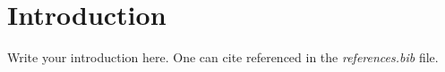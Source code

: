 \section{Introduction}

Write your introduction here. One can cite\cite{ARXIVEXAMPLE} referenced in the \textit{references.bib} file.